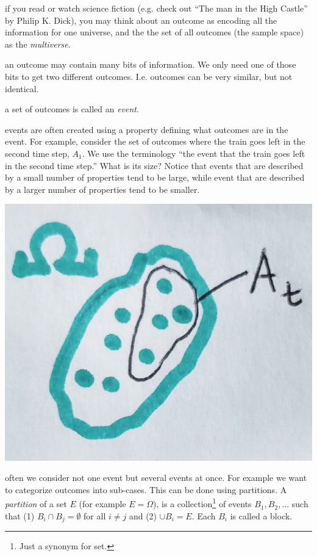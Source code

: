 \documentclass{article}
\begin{document}
 if you read or watch science fiction (e.g. check out ``The man in the High Castle'' by Philip K. Dick), you may think about an outcome as encoding all the information for one universe, and the the set of all outcomes (the sample space) as the \emph{multiverse}. 

 an outcome may contain many bits of information. We only need one of those bits to get two different outcomes. I.e. outcomes can be very similar, but not identical. 

 a set of outcomes is called an \emph{event}.

 events are often created using a property defining what outcomes are in the event. For example, consider the set of outcomes where the train goes left in the second time step, $A_1$. We use the terminology ``the event that the train goes left in the second time step.''  What is its size? Notice that events that are described by a small number of properties tend to be large, while event that are described by a larger number of properties tend to be smaller. 
\begin{center}
	\includegraphics[width=0.3\linewidth]{figures/event}
\end{center}

 often we consider not one event but several events at once. For example we want to categorize outcomes into sub-cases. This can be done using partitions. A \emph{partition} of a set $E$ (for example $E = \Omega$), is a collection\footnote{Just a synonym for set.} of events $B_1, B_2, \dots$ such that (1) $B_i \cap B_j = \emptyset$ for all $i \neq j$ and (2) $\cup B_i = E$. Each $B_i$ is called a block.
\end{document}

